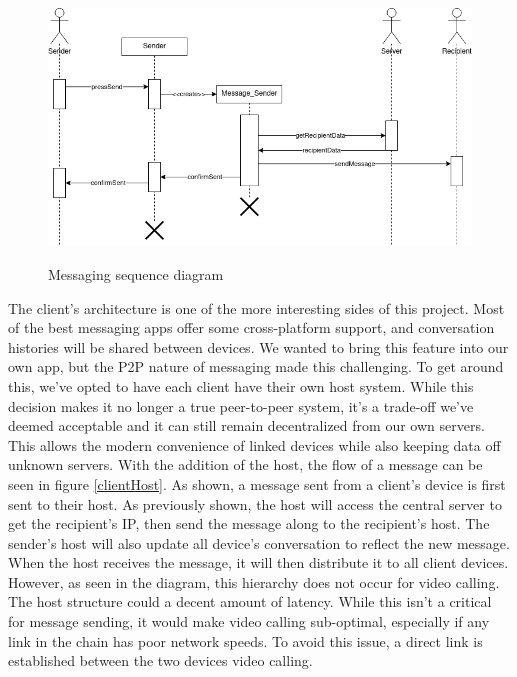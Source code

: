 \documentclass[titlepage]{article}
\begin{document}
    \begin{center}
        \begin{figure}[!ht]
            \includegraphics[scale=.5]{graphics/SequenceDiagram.png}
            \label{sequence}
            \caption{Messaging sequence diagram}
        \end{figure}
    \end{center}

    The client's architecture is one of the more interesting sides of this project.
    Most of the best messaging apps offer some cross-platform support, and conversation histories will be shared between devices.
    We wanted to bring this feature into our own app, but the P2P nature of messaging made this challenging.
    To get around this, we've opted to have each client have their own host system.
    While this decision makes it no longer a true peer-to-peer system, it's a trade-off we've deemed acceptable and it can still remain decentralized from our own servers.
    This allows the modern convenience of linked devices while also keeping data off unknown servers.
    With the addition of the host, the flow of a message can be seen in figure \ref{clientHost}.
    As shown, a message sent from a client's device is first sent to their host.
    As previously shown, the host will access the central server to get the recipient's IP, then send the message along to the recipient's host.
    The sender's host will also update all device's conversation to reflect the new message.
    When the host receives the message, it will then distribute it to all client devices.
    However, as seen in the diagram, this hierarchy does not occur for video calling.
    The host structure could a decent amount of latency.
    While this isn't a critical for message sending, it would make video calling sub-optimal, especially if any link in the chain has poor network speeds.
    To avoid this issue, a direct link is established between the two devices video calling.
\end{document}
